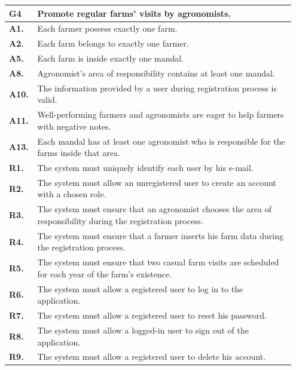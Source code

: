 \begin{longtable}{p{0.07\linewidth} p{0.88\linewidth}} 
    \toprule
    \textbf{G4} & Promote regular farms’ visits by agronomists. \\ 
    \midrule
    \textbf{A1.} & Each farmer possess exactly one farm.\\
    \textbf{A2.} & Each farm belongs to exactly one farmer.\\ 
    \textbf{A5.} & Each farm is inside exactly one mandal.\\ 
    \textbf{A8.} & Agronomist's area of responsibility contains at least one mandal.\\ 
    \textbf{A10.} & The information provided by a user during registration process is valid.\\ 
    \textbf{A11.} & Well-performing farmers and agronomists are eager to help farmers with negative notes.\\ 
    \textbf{A13.} & Each mandal has at least one agronomist who is responsible for the farms inside that area.\\ 
    \midrule
    
	\textbf{R1.} & The system must uniquely identify each user by his e-mail. \\
	\textbf{R2.} & The system must allow an unregistered user to create an account with a chosen role. \\
	\textbf{R3.} & The system must ensure that an agronomist chooses the area of responsibility during the registration process. \\
	\textbf{R4.} & The system must ensure that a farmer inserts his farm data during the registration process.\\
	\textbf{R5.} & The system must ensure that two casual farm visits are scheduled for each year of the farm's existence.\\
	\textbf{R6.} & The system must allow a registered user to log in to the application. \\
	\textbf{R7.} & The system must allow a registered user to reset his password. \\
	\textbf{R8.} & The system must allow a logged-in user to sign out of the application. \\
	\textbf{R9.} & The system must allow a registered user to delete his account. \\
	

\end{longtable}
